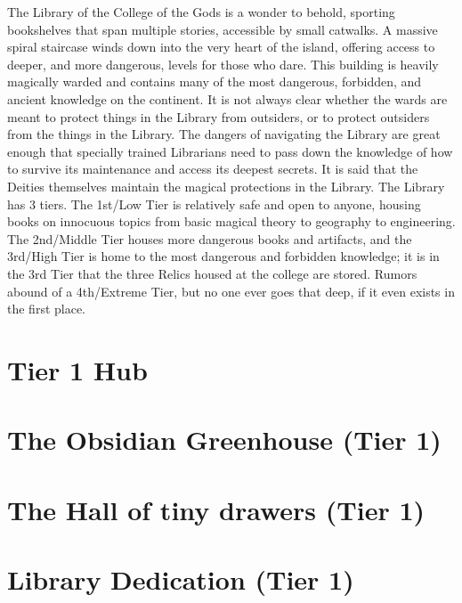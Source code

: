 \documentclass[sheet]{GL2020}
\begin{document}
The Library of the College of the Gods is a wonder to behold, sporting bookshelves that span multiple stories, accessible by small catwalks. A massive spiral staircase winds down into the very heart of the island, offering access to deeper, and more dangerous, levels for those who dare. This building is heavily magically warded and contains many of the most dangerous, forbidden, and ancient knowledge on the continent. It is not always clear whether the wards are meant to protect things in the Library from outsiders, or to protect outsiders from the things in the Library. The dangers of navigating the Library are great enough that specially trained Librarians need to pass down the knowledge of how to survive its maintenance and access its deepest secrets. It is said that the Deities themselves maintain the magical protections in the Library. The Library has 3 tiers. The 1st/Low Tier is relatively safe and open to anyone, housing books on innocuous topics from basic magical theory to geography to engineering. The 2nd/Middle Tier houses more dangerous books and artifacts, and the 3rd/High Tier is home to the most dangerous and forbidden knowledge; it is in the 3rd Tier that the three Relics housed at the college are stored. Rumors abound of a 4th/Extreme Tier, but no one ever goes that deep, if it even exists in the first place.


\clearpage
\setcounter{page}{1}

\section*{Tier 1 Hub}
\label{TierOneHub}

\clearpage

\section*{The Obsidian Greenhouse (Tier 1)}
\label{ObsidianGreenhouse}

\clearpage

\section*{The Hall of tiny drawers (Tier 1)}
\label{HallofTinyDrawers}

\clearpage

\section*{Library Dedication (Tier 1)}
\label{LibraryDedication}
\end{document}
